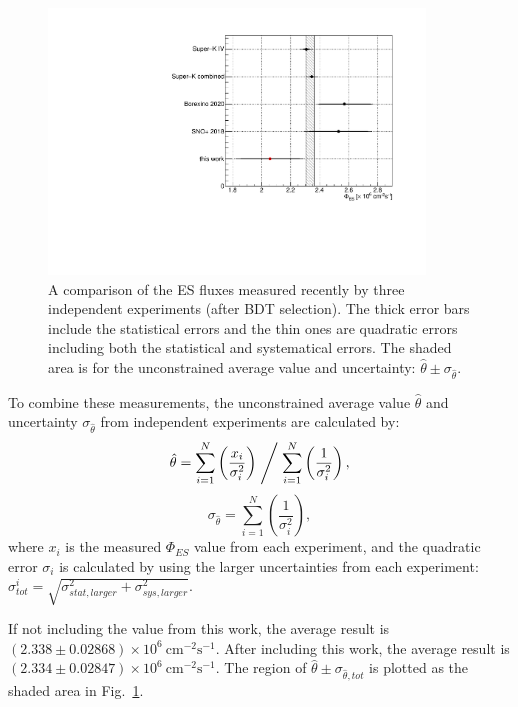 \begin{figure}[!htb]
	\centering
	\includegraphics[width=10cm]{ESfluxCompareMLP.pdf}
	\caption[A comparison of the ES flux measured recently by three independent experiments (after BDT selection).]{A comparison of the ES fluxes measured recently by three independent experiments (after BDT selection). The thick error bars include the statistical errors and the thin ones are quadratic errors including both the statistical and systematical errors. The shaded area is for the unconstrained average value and uncertainty: $\hat \theta \pm \sigma_{\hat \theta}$.}
	\label{fig:ESfluxCompareBDT}
\end{figure}

To combine these measurements, the unconstrained average value $\hat \theta$ and uncertainty $\sigma_{\hat\theta}$ from independent experiments are calculated by\cite{pdg2020,behnke2013data}:
\begin{equation}
\hat \theta = \sum_{i=1}^{N} \left(\frac{x_i}{\sigma_i^2}\right)\Biggm/\sum_{i=1}^{N}\left(\frac{1}{\sigma_i^2}\right),
\end{equation}
\begin{equation}
\sigma_{\hat\theta} = \sum_{i=1}^{N}\left(\frac{1}{\sigma_i^2}\right),
\end{equation}
where $x_i$ is the measured $\Phi_{ES}$ value from each experiment, and the quadratic error $\sigma_i$ is calculated by using the larger uncertainties from each experiment: $\sigma^i_{tot}=\sqrt{\sigma^2_{stat,larger}+\sigma^2_{sys,larger}}$.

If not including the value from this work, the average result is $(2.338 \pm 0.02868)\times  10^6~\mathrm{cm^{-2}s^{-1}}$. After including this work, the average result is  
$(2.334\pm0.02847)\times 10^6~\mathrm{cm^{-2}s^{-1}}$. The region of $\hat \theta\pm\sigma_{\hat\theta,tot}$ is plotted as the shaded area in Fig.~\ref{fig:ESfluxCompareBDT}.

